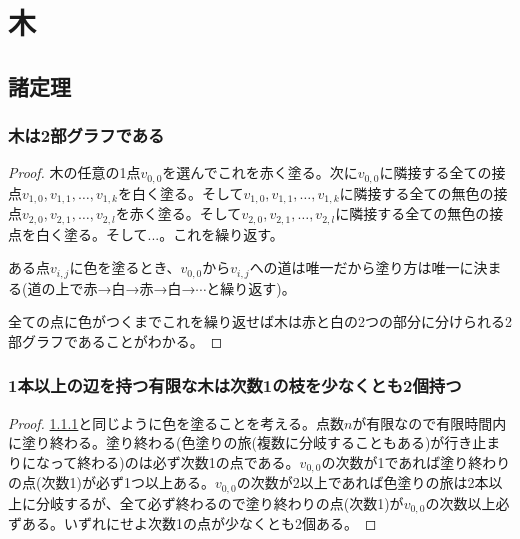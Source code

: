 \chapter{木}
    \section{諸定理}
        \subsection{木は2部グラフである}
            \label{subsec:木は2部グラフである}
            \begin{proof}
                \quad\par
                木の任意の1点$v_{0,0}$を選んでこれを赤く塗る。次に$v_{0,0}$に隣接する全ての接点$v_{1,0},v_{1,1},\dotsc,v_{1,k}$を白く塗る。そして$v_{1,0},v_{1,1},\dotsc,v_{1,k}$に隣接する全ての無色の接点$v_{2,0},v_{2,1},\dotsc,v_{2,l}$を赤く塗る。そして$v_{2,0},v_{2,1},\dotsc,v_{2,l}$に隣接する全ての無色の接点を白く塗る。そして...。これを繰り返す。
                \par
                ある点$v_{i,j}$に色を塗るとき、$v_{0,0}$から$v_{i,j}$への道は唯一だから塗り方は唯一に決まる(道の上で赤→白→赤→白→$\dotsb$と繰り返す)。
                \par
                全ての点に色がつくまでこれを繰り返せば木は赤と白の2つの部分に分けられる2部グラフであることがわかる。
            \end{proof}
        \subsection{1本以上の辺を持つ有限な木は次数1の枝を少なくとも2個持つ}
            \begin{proof}
                \quad\par
                \ref{subsec:木は2部グラフである}と同じように色を塗ることを考える。点数$n$が有限なので有限時間内に塗り終わる。塗り終わる(色塗りの旅(複数に分岐することもある)が行き止まりになって終わる)のは必ず次数1の点である。$v_{0,0}$の次数が1であれば塗り終わりの点(次数1)が必ず1つ以上ある。$v_{0,0}$の次数が2以上であれば色塗りの旅は2本以上に分岐するが、全て必ず終わるので塗り終わりの点(次数1)が$v_{0,0}$の次数以上必ずある。いずれにせよ次数1の点が少なくとも2個ある。
            \end{proof}
